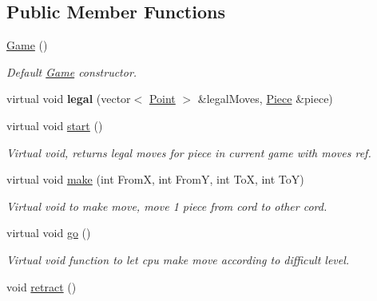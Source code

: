\subsection*{Public Member Functions}
\begin{DoxyCompactItemize}
\item 
\hypertarget{class_game_ad59df6562a58a614fda24622d3715b65}{\hyperlink{class_game_ad59df6562a58a614fda24622d3715b65}{Game} ()}\label{class_game_ad59df6562a58a614fda24622d3715b65}

\begin{DoxyCompactList}\small\item\em Default \hyperlink{class_game}{Game} constructor. \end{DoxyCompactList}\item 
\hypertarget{class_game_acf61b27aed22684d96fbc7fa2692feeb}{virtual void {\bfseries legal} (vector$<$ \hyperlink{struct_point}{Point} $>$ \&legal\-Moves, \hyperlink{class_piece}{Piece} \&piece)}\label{class_game_acf61b27aed22684d96fbc7fa2692feeb}

\item 
virtual void \hyperlink{class_game_a3d9b98f7c4a96ecf578f75b96c9f0e90}{start} ()
\begin{DoxyCompactList}\small\item\em Virtual void, returns legal moves for piece in current game with moves ref. \end{DoxyCompactList}\item 
\hypertarget{class_game_a50b3e0e1e7a73793a9f9eae1b0660eff}{virtual void \hyperlink{class_game_a50b3e0e1e7a73793a9f9eae1b0660eff}{make} (int From\-X, int From\-Y, int To\-X, int To\-Y)}\label{class_game_a50b3e0e1e7a73793a9f9eae1b0660eff}

\begin{DoxyCompactList}\small\item\em Virtual void to make move, move 1 piece from cord to other cord. \end{DoxyCompactList}\item 
\hypertarget{class_game_ab411d0da584724addd4fdb96fc16b9a4}{virtual void \hyperlink{class_game_ab411d0da584724addd4fdb96fc16b9a4}{go} ()}\label{class_game_ab411d0da584724addd4fdb96fc16b9a4}

\begin{DoxyCompactList}\small\item\em Virtual void function to let cpu make move according to difficult level. \end{DoxyCompactList}\item 
\hypertarget{class_game_a9be0655102af94f1a37a7eaec1be36fc}{void \hyperlink{class_game_a9be0655102af94f1a37a7eaec1be36fc}{retract} ()}\label{class_game_a9be0655102af94f1a37a7eaec1be36fc}


\end{DoxyCompactItemize}
